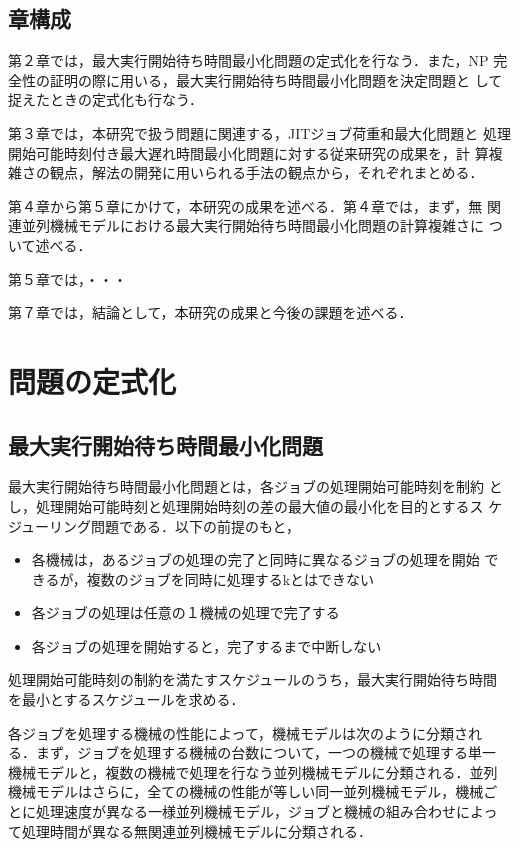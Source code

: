 \documentclass[12pt]{optlab-bachelor}
\begin{document}
\section{章構成}
第２章では，最大実行開始待ち時間最小化問題の定式化を行なう．また，NP
完全性の証明の際に用いる，最大実行開始待ち時間最小化問題を決定問題と
して捉えたときの定式化も行なう．

第３章では，本研究で扱う問題に関連する，JITジョブ荷重和最大化問題と
処理開始可能時刻付き最大遅れ時間最小化問題に対する従来研究の成果を，計
算複雑さの観点，解法の開発に用いられる手法の観点から，それぞれまとめる．

第４章から第５章にかけて，本研究の成果を述べる．第４章では，まず，無
関連並列機械モデルにおける最大実行開始待ち時間最小化問題の計算複雑さに
ついて述べる．

第５章では，・・・

第７章では，結論として，本研究の成果と今後の課題を述べる．

\chapter{問題の定式化}
\section{最大実行開始待ち時間最小化問題}
最大実行開始待ち時間最小化問題とは，各ジョブの処理開始可能時刻を制約
とし，処理開始可能時刻と処理開始時刻の差の最大値の最小化を目的とするス
ケジューリング問題である．以下の前提のもと，
\begin{itemize}
\item 各機械は，あるジョブの処理の完了と同時に異なるジョブの処理を開始
  できるが，複数のジョブを同時に処理するkとはできない
\item 各ジョブの処理は任意の１機械の処理で完了する
\item 各ジョブの処理を開始すると，完了するまで中断しない
\end{itemize}
処理開始可能時刻の制約を満たすスケジュールのうち，最大実行開始待ち時間
を最小とするスケジュールを求める．

各ジョブを処理する機械の性能によって，機械モデルは次のように分類され
る．まず，ジョブを処理する機械の台数について，一つの機械で処理する単一
機械モデルと，複数の機械で処理を行なう並列機械モデルに分類される．並列
機械モデルはさらに，全ての機械の性能が等しい同一並列機械モデル，機械ご
とに処理速度が異なる一様並列機械モデル，ジョブと機械の組み合わせによっ
て処理時間が異なる無関連並列機械モデルに分類される．
\end{document}
